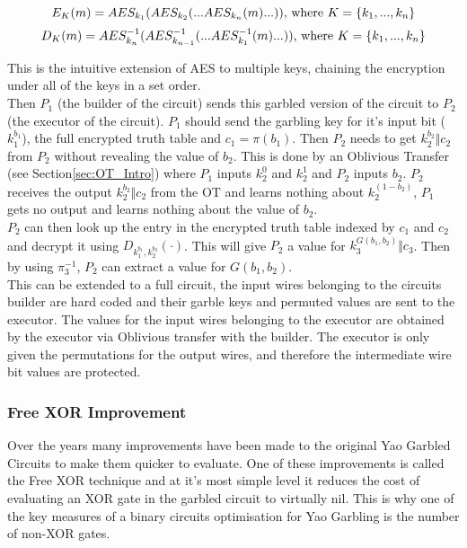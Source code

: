 \documentclass[ %
                    author={Nicholas Tutte},
                supervisor={Prof. Nigel Smart},
                    degree={MEng},
                     title={Secure Two Party Computation},
                  subtitle={A practical comparison of recent protocols},
                      type={Research - GG1K},
                      year={2015} ]{dissertation}
\begin{document}
			$$ E_K(m) = AES_{k_1}( AES_{k_2}( ...AES_{k_n}(m) ...) ) \textnormal{, where } K = \{k_1, ..., k_n\}$$ 
			$$ D_K(m) = AES^{-1}_{k_n}( AES^{-1}_{k_{n-1}}( ...AES^{-1}_{k_1}(m) ...) ) \textnormal{, where } K = \{k_1, ..., k_n\}$$ 

			This is the intuitive extension of AES to multiple keys, chaining the encryption under all of the keys in a set order.\\

			Then $P_1$ (the builder of the circuit) sends this garbled version of the circuit to $P_2$ (the executor of the circuit). $P_1$ should send the garbling key for it's input bit ($k_1^{b_1}$), the full encrypted truth table and $c_1 = \pi(b_1)$. Then $P_2$ needs to get $k_2^{b_2} \Vert c_2$ from $P_2$ without revealing the value of $b_2$. This is done by an Oblivious Transfer (see Section\ref{sec:OT_Intro}) where $P_1$ inputs $k_2^0$ and $k_2^1$ and $P_2$ inputs $b_2$. $P_2$ receives the output $k_2^{b_2} \Vert c_2$ from the OT and learns nothing about $k_2^{(1 - b_2)} $, $P_1$ gets no output and learns nothing about the value of $b_2$.\\

			$P_2$ can then look up the entry in the encrypted truth table indexed by $c_1$ and $c_2$ and decrypt it using $D_{k_1^{b_1}, k_2^{b_2}}(\cdot)$. This will give $P_2$ a value for $k_3^{G(b_1, b_2)} \Vert c_3$. Then by using $\pi_3^{-1}$, $P_2$ can extract a value for $G(b_1, b_2)$.\\

			This can be extended to a full circuit, the input wires belonging to the circuits builder are hard coded and their garble keys and permuted values are sent to the executor. The values for the input wires belonging to the executor are obtained by the executor via Oblivious transfer with the builder. The executor is only given the permutations for the output wires, and therefore the intermediate wire bit values are protected.

			\subsubsection{Free XOR Improvement}

				Over the years many improvements have been made to the original Yao Garbled Circuits to make them quicker to evaluate. One of these improvements is called the Free XOR technique and at it's most simple level it reduces the cost of evaluating an XOR gate in the garbled circuit to virtually nil. This is why one of the key measures of a binary circuits optimisation for Yao Garbling is the number of non-XOR gates.\\
\end{document}
